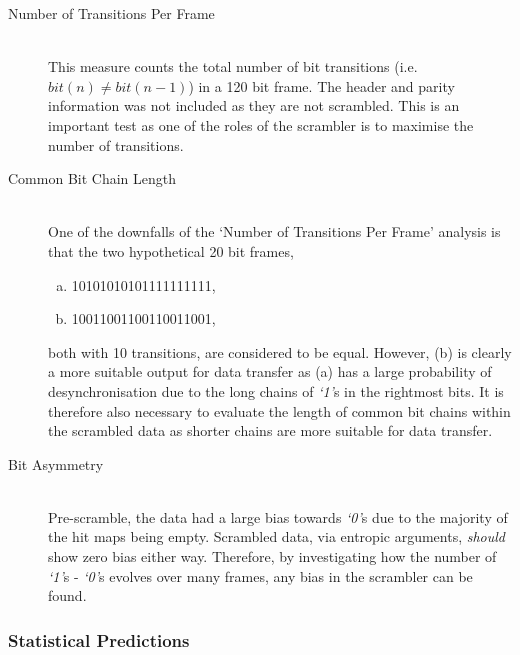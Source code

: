 			\begin{description}
				\item[Number of Transitions Per Frame] \hfill \\
					This measure counts the total number of bit transitions (i.e. $bit(n) \neq bit(n-1)$) in a 120 bit frame. 
					The header and parity information was not included as they are not scrambled.
					This is an important test as one of the roles of the scrambler is to maximise the number of transitions.

				\item[Common Bit Chain Length] \hfill \\
					One of the downfalls of the `Number of Transitions Per Frame' analysis is that the two hypothetical 20 bit frames,

					\begin{enumerate}[a)]
						\item \textsc{10101010101111111111},
						\item \textsc{10011001100110011001},
					\end{enumerate}

					both with 10 transitions, are considered to be equal. However, (b) is clearly a more suitable output for data transfer as (a) has a large probability of desynchronisation due to the long chains of \textit{`1'}s in the rightmost bits.
					It is therefore also necessary to evaluate the length of common bit chains within the scrambled data as shorter chains are more suitable for data transfer.

				\item[Bit Asymmetry] \hfill \\
					Pre-scramble, the data had a large bias towards \textit{`0'}s due to the majority of the hit maps being empty.
					Scrambled data, via entropic arguments, \textit{should} show zero bias either way.
					Therefore, by investigating how the number of \textit{`1'}s - \textit{`0'}s evolves over many frames, any bias in the scrambler can be found.

			\end{description}	

		\subsubsection{Statistical Predictions} %
		\label{subsub:statistical_predictions}

